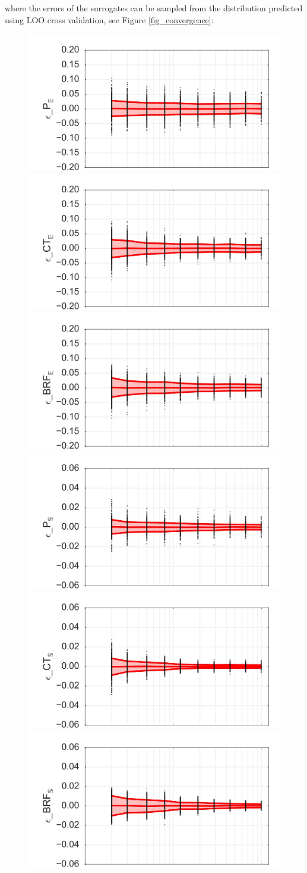 \documentclass[preprint,12pt]{elsarticle}
\begin{document}

\noindent where the errors of the surrogates can be sampled from the distribution predicted using LOO cross validation, see Figure \ref{fig_convergence}:


\begin{figure}[h!]
\begin{centering}
\includegraphics[width=0.32\columnwidth]{Figures/Convergence/CV_E_P.jpg}
\includegraphics[width=0.32\columnwidth]{Figures/Convergence/CV_E_CT.jpg}
\includegraphics[width=0.32\columnwidth]{Figures/Convergence/CV_E_BRFBM_EFL_M12.jpg} \\
\includegraphics[width=0.32\columnwidth]{Figures/Convergence/CV_V_P.jpg}
\includegraphics[width=0.32\columnwidth]{Figures/Convergence/CV_V_CT.jpg}
\includegraphics[width=0.32\columnwidth]{Figures/Convergence/CV_V_BRFBM_EFL_M12.jpg} \\

\end{centering}
\end{figure}
\end{document}
